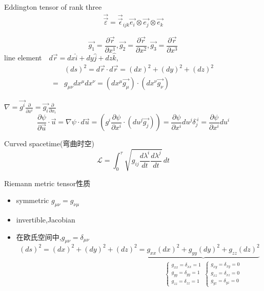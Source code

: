 \documentclass[12pt, a4paper, oneside, UTF8]{ctexbook}  %
\newcommand{\pa}{\partial}
\begin{document}
\begin{defn}
    Eddington tensor of rank three
    \begin{align*}
        \vec{\vec{\varepsilon}}=\vec{\vec{\epsilon}}_{ijk}\vec{e_i}\otimes\vec{e_j}\otimes\vec{e_k}
    \end{align*}
\end{defn}
\begin{defn}
    \[
    \vec{g_1}=\frac{\pa \vec{r}}{\pa x^1},
    \vec{g_2}=\frac{\pa \vec{r}}{\pa x^2},
    \vec{g_3}=\frac{\pa \vec{r}}{\pa x^3}
    \]
    line element$\quad d\vec{r}=dx\hat{i}+dy\hat{j}+dz\hat{k}$,
    \begin{align*}
        &(ds)^2=d\vec{r}\cdot d\vec{r}=(dx)^2+(dy)^2+(dz)^2\\
        =&g_{\mu\nu}dx^\mu dx^\nu=\left(dx^\mu \vec{g_\mu}\right)\cdot\left(dx^\nu\vec{g_\nu}\right)
    \end{align*}
\end{defn}
\begin{defn}
    \(\nabla=\vec{g^i}\frac{\pa}{\pa x^i}=\vec{g_i}\frac{\pa}{\pa x_i}\)
    \[
    \frac{\pa \psi}{\pa \vec{u}}\cdot\vec{u}=
    \nabla\psi\cdot d\vec{u}
    =\left(g^i\frac{\pa\psi}{\pa x^i}\cdot\left(du^j\vec{g_j}\right)\right)
    =\frac{\pa\psi}{\pa x^i}du^j\delta_j^{\cdot i}=\frac{\pa\psi}{\pa x^i}du^i
    \]
\end{defn}
\begin{defn}
    Curved spacetime(弯曲时空)
\[
\mathcal{L}=\int_{0}^{\tau}\sqrt{g_{ij}\frac{d\lambda^i}{dt}\frac{d\lambda^j}{dt}}\,dt
\]
\end{defn}
\begin{example}
    Riemann metric tensor性质
    \begin{itemize}
        \item symmetric $g_{\mu\nu}=g_{\nu\mu}$
        \item invertible,Jacobian
        \item 在欧氏空间中,$g_{\mu\nu}=\delta_{\mu\nu}$
        \begin{equation*}
            (ds)^2=(dx)^2+(dy)^2+(dz)^2
            =\underbrace{g_{xx}(dx)^2+g_{yy}(dy)^2+g_{zz}(dz)^2}_{
                \begin{aligned}
                    \begin{cases}
                        g_{xx}=\delta_{xx}=1\\
                        g_{yy}=\delta_{yy}=1\\
                        g_{zz}=\delta_{zz}=1
                    \end{cases}
                    \;\begin{cases}
                        g_{xy}=\delta_{xy}=0\\
                        g_{xz}=\delta_{xz}=0\\
                        g_{yz}=\delta_{yz}=0
                    \end{cases}
                \end{aligned}}
        \end{equation*}
    \end{itemize}
\end{example}
\end{document}
